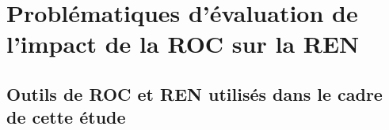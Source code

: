 \section{Problématiques d'évaluation de l'impact de la ROC sur la REN} 
\label{sec:OCR-IMPACT-NER}

\subsection{Outils de ROC et REN utilisés dans le cadre de cette étude}
\label{subsec:outils_OCR-IMPACT-NER}


